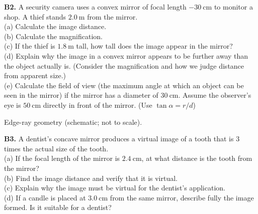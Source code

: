 \begin{exercisebox}[19]
\vspace{0.4cm}

\textbf{B2.} A security camera uses a convex mirror
of focal length $-30\ \text{cm}$ to monitor a shop.
A thief stands $2.0\ \text{m}$ from the mirror.\\[4pt]
(a) Calculate the image distance.\\
(b) Calculate the magnification.\\
(c) If the thief is $1.8\ \text{m}$ tall, how tall
does the image appear in the mirror?\\
(d) Explain why the image in a convex mirror
appears to be further away than the object
actually is. (Consider the magnification and how
we judge distance from apparent size.)\\
(e) Calculate the field of view (the maximum
angle at which an object can be seen in the mirror)
if the mirror has a diameter of $30\ \text{cm}$.
Assume the observer's eye is $50\ \text{cm}$ directly
in front of the mirror. (Use $\tan\alpha = r/d$)
\\[4pt]
\begin{center}
\end{center}
\small Edge-ray geometry (schematic; not to scale).\\
\hfill{}

\vspace{0.4cm}

\textbf{B3.} A dentist's concave mirror produces a
virtual image of a tooth that is $3$ times the
actual size of the tooth.\\[4pt]
(a) If the focal length of the mirror is
$2.4\ \text{cm}$, at what distance is the tooth
from the mirror?\\
(b) Find the image distance and verify that
it is virtual.\\
(c) Explain why the image must be virtual for
the dentist's application.\\
(d) If a candle is placed at $3.0\ \text{cm}$
from the same mirror, describe fully the image
formed. Is it suitable for a dentist?
\hfill{}


\end{exercisebox}

